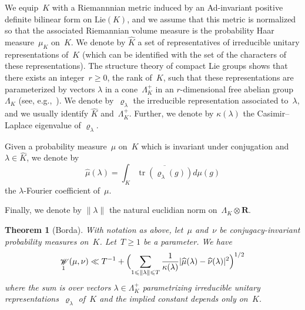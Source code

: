 \documentclass[12pt]{amsart}
\renewcommand{\mathcal}{\mathscr}
\renewcommand{\leq}{\leqslant}
\renewcommand{\geq}{\geqslant}
\newcommand{\Rr}{\mathbf{R}}
\DeclareMathOperator{\wass}{\mathcal{W}}
\DeclareMathOperator{\Tr}{tr}
\renewcommand{\rho}{\varrho}
\theoremstyle{plain}
\newtheorem{theorem}{Theorem}[section]
\theoremstyle{remark}
\theoremstyle{definition}
\renewcommand{\geq}{\geqslant}
\renewcommand{\leq}{\leqslant}
\begin{document}
We equip~$K$ with a Riemannnian metric induced by an Ad-invariant
positive definite bilinear form on $\mathrm{Lie}(K)$, and we assume that
this metric is normalized so that the associated Riemannian volume
measure is the probability Haar measure~$\mu_K$ on~$K$.
We denote by $\widehat{K}$ a set of representatives of irreducible
unitary representations of~$K$ (which can be identified with the set
of the characters of these representations). The structure theory of
compact Lie groups shows that there exists an integer~$r\geq 0$, the
rank of~$K$, such that these representations are parameterized by
vectors $\lambda$ in a cone~$\Lambda_K^+$ in an $r$-dimensional free
abelian group~$\Lambda_K$ (see,
e.g.,~\cite[p.\,67,\,Th.\,1]{lie9}). We denote by~$\rho_{\lambda}$ the
irreducible representation associated to~$\lambda$, and we usually
identify $\widehat{K}$ and~$\Lambda_K^+$. Further, we denote by
$\kappa(\lambda)$ the Casimir--Laplace eigenvalue of $\rho_{\lambda}$.

Given a probability measure~$\mu$ on~$K$ which is invariant under
conjugation and $\lambda\in\widehat{K}$, we denote by
\[
  \widehat{\mu}(\lambda)=\int_K
  \overline{\Tr(\rho_{\lambda}(g))}d\mu(g)
\]
the $\lambda$-Fourier coefficient of~$\mu$.

Finally, we  denote by $\|\lambda\|$ the natural euclidian norm
on~$\Lambda_K\otimes\Rr$.


\begin{theorem}[Borda]\label{th-borda-conjugacy}
  With notation as above, let~$\mu$ and~$\nu$ be conjugacy-invariant
  probability measures on~$K$. Let~$T\geq 1$ be a parameter. We have
  \[
    \wass_1(\mu,\nu)\ll T^{-1}+\Bigl( \sum_{1\leq \|\lambda\|\leq
      T} \frac{1}{\kappa(\lambda)}
    |\widehat{\mu}(\lambda)-\widehat{\nu}(\lambda)|^2 \Bigr)^{1/2}
  \]
  where the sum is over vectors $\lambda\in\Lambda_K^+$ parametrizing
  irreducible unitary representations~$\rho_{\lambda}$ of~$K$ and the
  implied constant depends only on~$K$.
\end{theorem}
\end{document}
